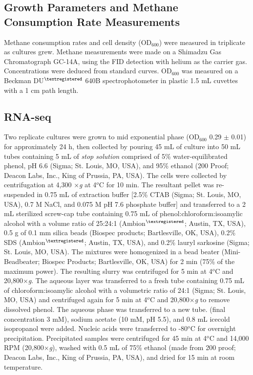 \subsection{Growth Parameters and Methane Consumption Rate Measurements}
Methane consumption rates and cell density (OD$_{600}$) were measured in triplicate as cultures grew.
Methane measurements were made on a Shimadzu Gas Chromatograph GC-14A, using the FID detection with helium as the carrier gas.
Concentrations were deduced from standard curves.
OD$_{600}$ was measured on a Beckman DU$^{\textregistered}$ 640B spectrophotometer in plastic 1.5 mL cuvettes with a 1 cm path length.

\subsection{RNA-seq}
Two replicate cultures were grown to mid exponential phase (OD$_{600}$ 0.29 $\pm$ 0.01) for approximately 24 h, then collected by pouring 45 mL of culture into 50 mL tubes containing 5 mL of \textit{stop solution} comprised of 5\% water-equilibrated phenol, pH 6.6 (Sigma; St. Louis, MO, USA), and 95\% ethanol (200 Proof; Deacon Labs, Inc., King of Prussia, PA, USA).
The cells were collected by centrifugation at 4,300 $\times$\textit{g} at 4$^o$C for 10 min.
The resultant pellet was re-suspended in 0.75 mL of extraction buffer [2.5\% CTAB (Sigma; St. Louis, MO, USA), 0.7 M NaCl, and 0.075 M pH 7.6 phosphate buffer] and transferred to a 2 mL sterilized screw-cap tube containing 0.75 mL of phenol:chloroform:isoamylic alcohol with a volume ratio of 25:24:1 (Ambion$^{\textregistered}$; Austin, TX, USA), 0.5 g of 0.1 mm silica beads (Biospec products; Bartlesville, OK, USA), 0.2\% SDS (Ambion$^{\textregistered}$; Austin, TX, USA), and 0.2\% lauryl sarkosine (Sigma; St. Louis, MO, USA).
The mixtures were homogenized in a bead beater (Mini-Beadbeater; Biospec Products; Bartlesville, OK, USA) for 2 min (75\% of the maximum power).
The resulting slurry was centrifuged for 5 min at 4$^o$C and 20,800$\times$\textit{g}.
The aqueous layer was transferred to a fresh tube containing 0.75 mL of chloroform:isoamylic alcohol with a volumetric ratio of 24:1 (Sigma; St. Louis, MO, USA) and centrifuged again for 5 min at 4$^o$C and 20,800$\times$\textit{g} to remove dissolved phenol.
The aqueous phase was transferred to a new tube.  (final concentration 3 mM), sodium acetate (10 mM, pH 5.5), and 0.8 mL icecold isopropanol were added.
Nucleic acids were transferred to -80$^o$C for overnight precipitation.
Precipitated samples were centrifuged for 45 min at 4$^o$C and 14,000 RPM (20,800$\times$\textit{g}), washed with 0.5 mL of 75\% ethanol (made from 200 proof; Deacon Labs, Inc., King of Prussia, PA, USA), and dried for 15 min at room temperature.

